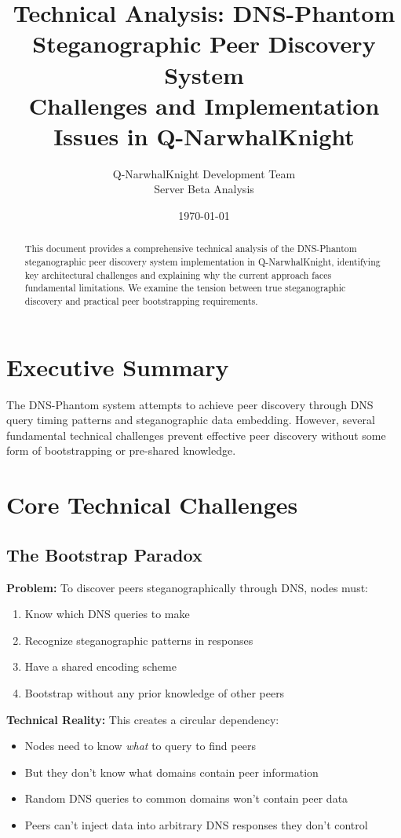 \documentclass[12pt,a4paper]{article}
\title{Technical Analysis: DNS-Phantom Steganographic Peer Discovery System\\
\large Challenges and Implementation Issues in Q-NarwhalKnight}
\author{Q-NarwhalKnight Development Team\\Server Beta Analysis}
\date{\today}
\begin{document}
\maketitle

\begin{abstract}
This document provides a comprehensive technical analysis of the DNS-Phantom steganographic peer discovery system implementation in Q-NarwhalKnight, identifying key architectural challenges and explaining why the current approach faces fundamental limitations. We examine the tension between true steganographic discovery and practical peer bootstrapping requirements.
\end{abstract}

\section{Executive Summary}

The DNS-Phantom system attempts to achieve peer discovery through DNS query timing patterns and steganographic data embedding. However, several fundamental technical challenges prevent effective peer discovery without some form of bootstrapping or pre-shared knowledge.

\section{Core Technical Challenges}

\subsection{The Bootstrap Paradox}

\textbf{Problem:} To discover peers steganographically through DNS, nodes must:
\begin{enumerate}
    \item Know which DNS queries to make
    \item Recognize steganographic patterns in responses
    \item Have a shared encoding scheme
    \item Bootstrap without any prior knowledge of other peers
\end{enumerate}

\textbf{Technical Reality:} This creates a circular dependency:
\begin{itemize}
    \item Nodes need to know \textit{what} to query to find peers
    \item But they don't know what domains contain peer information
    \item Random DNS queries to common domains won't contain peer data
    \item Peers can't inject data into arbitrary DNS responses they don't control
\end{itemize}
\end{document}
